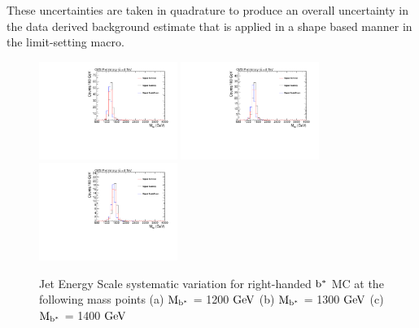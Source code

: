 These uncertainties are
taken in quadrature to produce an overall uncertainty in the data
derived background estimate that is applied in a shape based manner in
the limit-setting macro. 

\begin{figure}[htcb]
\begin{center}
\includegraphics[width=0.4\textwidth]{AN-14-049/figs/Signal_M1200_PtScaling}
\includegraphics[width=0.4\textwidth]{AN-14-049/figs/Signal_M1300_PtScaling}
\includegraphics[width=0.4\textwidth]{AN-14-049/figs/Signal_M1400_PtScaling}
\caption{
Jet Energy Scale systematic variation for right-handed $\mathrm{b}^{*}$  MC at the following mass points
(a) $\mathrm{M_{\mathrm{b}^{*}}}$ = 1200$~\mathrm{GeV}$ 
(b) $\mathrm{M_{\mathrm{b}^{*}}}$ = 1300$~\mathrm{GeV}$
(c) $\mathrm{M_{\mathrm{b}^{*}}}$ = 1400$~\mathrm{GeV}$ 
}
\label{figs:bssignalJES}
\end{center}
\end{figure}

